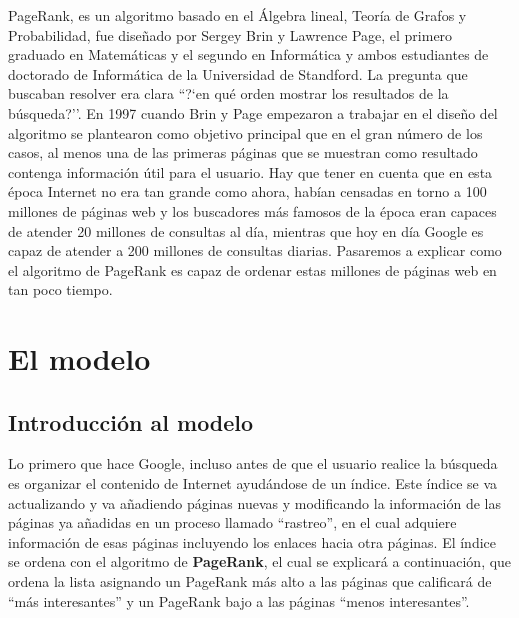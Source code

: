 \documentclass[size=a4, parskip=half, titlepage=false, toc=flat, toc=bib, 12pt]{scrartcl}
\theoremstyle{theorem-style}
\theoremstyle{definition-style}
\theoremstyle{remark-style}
\theoremstyle{example-style}
\theoremstyle{definition-style}
\theoremstyle{remark-style}
\begin{document}
PageRank, es un algoritmo basado en el Álgebra lineal, Teoría de Grafos y Probabilidad, fue diseñado por Sergey Brin y Lawrence Page, el primero graduado en Matemáticas y el segundo en Informática y ambos estudiantes de doctorado de Informática de la Universidad de Standford. La pregunta que buscaban resolver era clara ``?`en qué orden mostrar los resultados de la búsqueda?''. En 1997 cuando Brin y Page empezaron a trabajar en el diseño del algoritmo se plantearon como objetivo principal que en el gran número de los casos, al menos una de las primeras páginas que se muestran como resultado contenga información útil para el usuario. Hay que tener en cuenta que en esta época Internet no era tan grande como ahora, habían censadas en torno a 100 millones de páginas web y los buscadores más famosos de la época eran capaces de atender 20 millones de consultas al día, mientras que hoy en día Google es capaz de atender a 200 millones de consultas diarias. Pasaremos a explicar como el algoritmo de PageRank es capaz de ordenar estas millones de páginas web en tan poco tiempo.

\section{El modelo}

\subsection{Introducción al modelo}
Lo primero que hace Google, incluso antes de que el usuario realice la búsqueda es organizar el contenido de Internet ayudándose de un índice. Este índice se va actualizando y va añadiendo páginas nuevas y modificando la información de las páginas ya añadidas en un proceso llamado ``rastreo'', en el cual adquiere información de esas páginas incluyendo los enlaces hacia otra páginas. El índice se ordena con el algoritmo de \textbf{PageRank}, el cual se explicará a continuación, que ordena la lista asignando un PageRank más alto a las páginas que calificará de ``más interesantes'' y un PageRank bajo a las páginas ``menos interesantes''.
\end{document}
